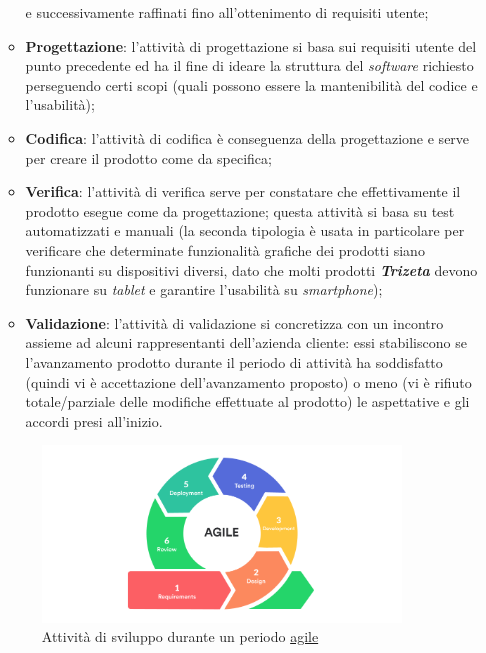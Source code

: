 \begin{itemize}
\begin{itemize}
                e successivamente raffinati fino all'ottenimento di requisiti utente;
            \item \textbf{Progettazione}: l'attività di progettazione si basa sui requisiti utente del punto precedente ed ha il fine di ideare la struttura del \textit{software} richiesto perseguendo certi scopi 
                (quali possono essere la mantenibilità del codice e l'usabilità);
            \item \textbf{Codifica}: l'attività di codifica è conseguenza della progettazione e serve per creare il prodotto come da specifica;
            \item \textbf{Verifica}: l'attività di verifica serve per constatare che effettivamente il prodotto esegue come da progettazione; questa attività si basa su test automatizzati e manuali (la seconda tipologia
                è usata in particolare per verificare che determinate funzionalità grafiche dei prodotti siano funzionanti su dispositivi diversi, dato che molti prodotti \textit{\textbf{Trizeta}} devono
                funzionare su \textit{tablet} e garantire l'usabilità su \textit{smartphone});
            \item \textbf{Validazione}: l'attività di validazione si concretizza con un incontro assieme ad alcuni rappresentanti dell'azienda cliente: essi stabiliscono se l'avanzamento prodotto durante il periodo di attività ha soddisfatto
                (quindi vi è accettazione dell'avanzamento proposto) o meno (vi è rifiuto totale/parziale delle modifiche effettuate al prodotto) le aspettative e gli accordi presi all'inizio.
        \end{itemize}
        \begin{figure}[H]
            \centering
            \includegraphics[width=0.9\textwidth]{images/agile.png}
            \caption[Attività di sviluppo durante un periodo agile]{Attività di sviluppo durante un periodo \hyperref[app:agile]{agile} \footnotemark}
        \end{figure}

\end{itemize}
